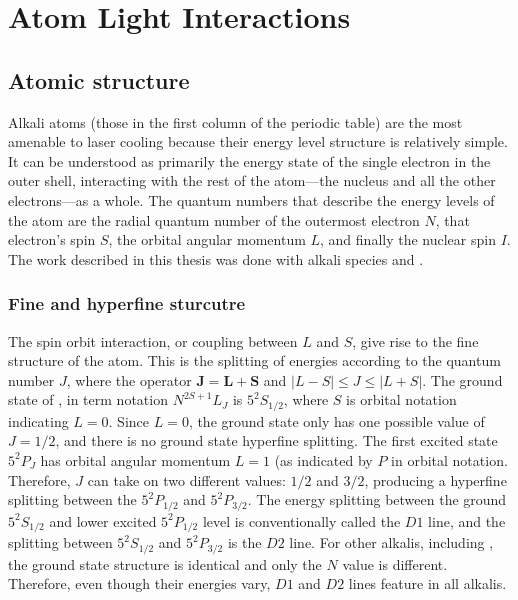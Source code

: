 \renewcommand{\thechapter}{3}

\chapter{Atom Light Interactions}

\section{Atomic structure}

Alkali atoms (those in the first column of the periodic table) are the most amenable to laser cooling because their energy level structure is relatively simple. It can be understood as primarily the energy state of the single electron in the outer shell, interacting with the rest of the atom---the nucleus and all the other electrons---as a whole. The quantum numbers that describe the energy levels of the atom are the radial quantum number of the outermost electron $N$, that electron's spin $S$, the orbital angular momentum $L$, and finally the nuclear spin $I$. The work described in this thesis was done with alkali species \Rb{} and \K{}.

\subsection{Fine and hyperfine sturcutre}

The spin orbit interaction, or coupling between $L$ and $S$, give rise to the fine structure of the atom. This is the splitting of energies according to the quantum number $J$, where the operator $\textbf{J}=\textbf{L}+\textbf{S}$ and $|L - S| \leq J \leq |L + S|$.  The ground state of \Rb{}, in term notation $N^{2S+1}L_J$ is $5^2S_{1/2}$, where $S$ is orbital notation indicating $L=0$. Since $L=0$, the ground state only has one possible value of $J=1/2$, and there is no ground state hyperfine splitting. The first excited state $5^2P_J$ has orbital angular momentum $L=1$ (as indicated by $P$ in orbital notation. Therefore, $J$ can take on two different values: $1/2$ and $3/2$, producing a hyperfine splitting between the $5^2P_{1/2}$ and $5^2P_{3/2}$. The energy splitting between the ground $5^2S_{1/2}$ and lower excited $5^2P_{1/2}$ level is conventionally called the $D1$ line, and the splitting between $5^2S_{1/2}$ and  $5^2P_{3/2}$ is the $D2$ line. For other alkalis, including \K{}, the ground state structure is identical and only the $N$ value is different. Therefore, even though their energies vary, $D1$ and $D2$ lines feature in all alkalis.

